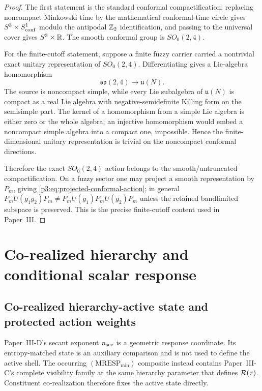 \documentclass[12pt,a4paper]{article}
\begin{document}
\begin{proof}
The first statement is the standard conformal compactification: replacing noncompact Minkowski time by the mathematical conformal-time circle gives \(S^3\times S^1_{\rm conf}\) modulo the antipodal \(\mathbb{Z}_2\) identification, and passing to the universal cover gives \(S^3\times\mathbb{R}\).  The smooth conformal group is \(SO_0(2,4)\).

For the finite-cutoff statement, suppose a finite fuzzy carrier carried a nontrivial exact unitary representation of \(SO_0(2,4)\).  Differentiating gives a Lie-algebra homomorphism
\[
        \mathfrak{so}(2,4)\longrightarrow \mathfrak u(N).
\]
The source is noncompact simple, while every Lie subalgebra of \(\mathfrak u(N)\) is compact as a real Lie algebra with negative-semidefinite Killing form on the semisimple part.  The kernel of a homomorphism from a simple Lie algebra is either zero or the whole algebra; an injective homomorphism would embed a noncompact simple algebra into a compact one, impossible.  Hence the finite-dimensional unitary representation is trivial on the noncompact conformal directions.

Therefore the exact \(SO_0(2,4)\) action belongs to the smooth/untruncated compactification.  On a fuzzy sector one may project a smooth representation by \(P_m\), giving \eqref{p3:eq:projected-conformal-action}; in general \(P_mU(g_1g_2)P_m\ne P_mU(g_1)P_mU(g_2)P_m\) unless the retained bandlimited subspace is preserved.  This is the precise finite-cutoff content used in Paper~III.
\end{proof}


\section{Co-realized hierarchy and conditional scalar response}
\label{paper3e:sec:organized-scalar}
\subsection{Co-realized hierarchy-active state and protected action weights}
\label{p3:sec:index-locking}

Paper~III-D's secant exponent \(n_{\rm sec}\) is a geometric response
coordinate.  Its entropy-matched state is an auxiliary comparison and is not
used to define the active shell.  The occurring
\((\mathrm{MRESP}_{\min})\) composite
instead contains Paper~III-C's complete visibility family at the same
hierarchy parameter that defines \(\mathcal R(\tau)\).  Constituent co-realization
therefore fixes the active state directly.
\end{document}
